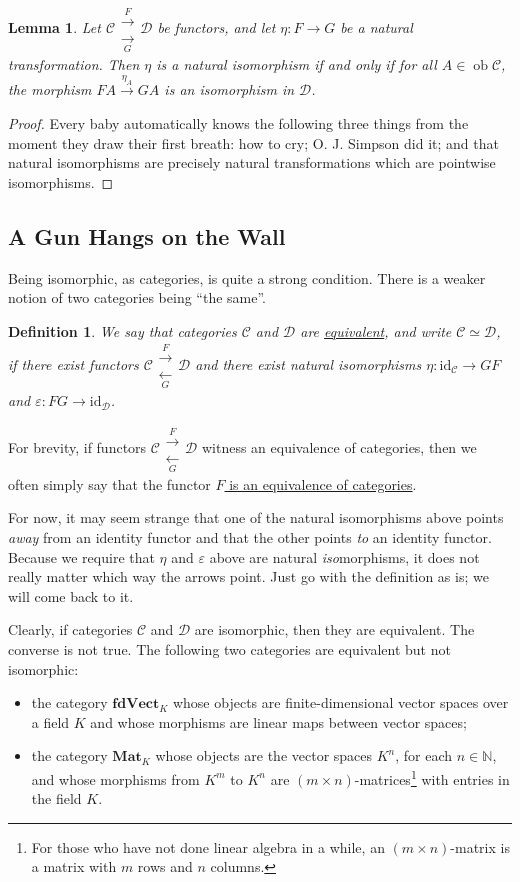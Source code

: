 \documentclass[a4paper,11pt]{article}
\theoremstyle{break_italics}
\newtheorem*{lemma*}{Lemma}
\newtheorem*{definition*}{Definition}
\theoremstyle{break_upright}
\theoremstyle{remark}
\newcommand{\N}{\mathbb{N}}
\newcommand{\id}{\mathrm{id}}
\newcommand{\ob}{\operatorname{ob}}
\newcommand{\C}{\mathcal{C}}
\newcommand{\D}{\mathcal{D}}
\begin{document}
\begin{lemma*}
Let $\C \substack{\xrightarrow{F} \\ \xrightarrow[G]{}} \D$ be functors, and let $\eta \colon F \to G$ be a natural transformation. Then $\eta$ is a natural isomorphism if and only if for all $A \in \ob\C$, the morphism $FA \xrightarrow{\eta_A} GA$ is an isomorphism in $\D$.
\end{lemma*}
\begin{proof}
Every baby automatically knows the following three things from the moment they draw their first breath: how to cry; O. J. Simpson did it; and that natural isomorphisms are precisely natural transformations which are pointwise isomorphisms.
\end{proof}

\subsection{A Gun Hangs on the Wall}

Being isomorphic, as categories, is quite a strong condition. There is a weaker notion of two categories being ``the same''.

\begin{definition*}
	We say that categories $\C$ and $\D$ are \uline{equivalent}, and write $\C \simeq \D$, if there exist functors $\C \substack{\xrightarrow{F} \\ \xleftarrow[G]{}} \D$ and there exist natural isomorphisms $\eta \colon \id_\C \to GF$ and $\varepsilon \colon FG \to \id_\D$.	
\end{definition*}

For brevity, if functors $\C \substack{\xrightarrow{F} \\ \xleftarrow[G]{}} \D$ witness an equivalence of categories, then we often simply say that the functor \uline{$F$ is an equivalence of categories}.

For now, it may seem strange that one of the natural isomorphisms above points \textit{away} from an identity functor and that the other points \textit{to} an identity functor. Because we require that $\eta$ and $\varepsilon$ above are natural \textit{iso}morphisms, it does not really matter which way the arrows point. Just go with the definition as is; we will come back to it.

Clearly, if categories $\C$ and $\D$ are isomorphic, then they are equivalent. The converse is not true. The following two categories are equivalent but not isomorphic:
\begin{itemize}
	\item the category $\mathbf{fdVect}_K$ whose objects are finite-dimensional vector spaces over a field $K$ and whose morphisms are linear maps between vector spaces;
	\item the category $\mathbf{Mat}_K$ whose objects are the vector spaces $K^n$, for each $n \in \N$, and whose morphisms from $K^m$ to $K^n$ are $(m \times n)$-matrices\footnote{For those who have not done linear algebra in a while, an $(m \times n)$-matrix is a matrix with $m$ rows and $n$ columns.} with entries in the field $K$.
\end{itemize}
\end{document}
